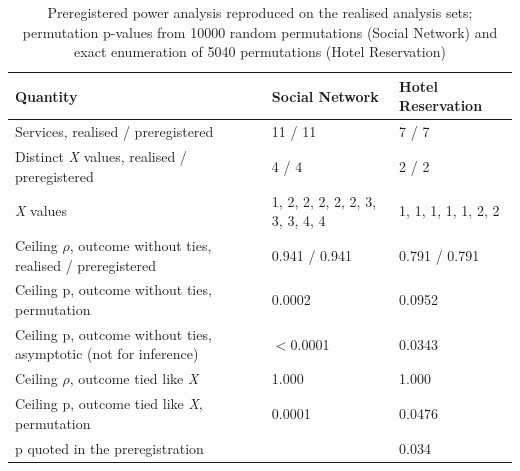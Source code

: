 \begin{table}[!t]
\centering
\caption{Preregistered power analysis reproduced on the realised analysis sets; permutation p-values from 10000 random permutations (Social Network) and exact enumeration of 5040 permutations (Hotel Reservation)}
\label{tab:tbl_ieee_power}
\footnotesize
\setlength{\tabcolsep}{3pt}

\begin{tabular}{p{3.9cm}p{2.0cm}p{1.9cm}}
\toprule
\textbf{Quantity} & \textbf{Social Network} & \textbf{Hotel Reservation} \\
\midrule
Services, realised / preregistered & 11 / 11 & 7 / 7 \\
Distinct \textit{X} values, realised / preregistered & 4 / 4 & 2 / 2 \\
\textit{X} values & 1, 2, 2, 2, 2, 2, 3, 3, 3, 4, 4 & 1, 1, 1, 1, 1, 2, 2 \\
Ceiling $\rho$, outcome without ties, realised / preregistered & 0.941 / 0.941 & 0.791 / 0.791 \\
Ceiling p, outcome without ties, permutation & 0.0002 & 0.0952 \\
Ceiling p, outcome without ties, asymptotic (not for inference) & $<$0.0001 & 0.0343 \\
Ceiling $\rho$, outcome tied like \textit{X} & 1.000 & 1.000 \\
Ceiling p, outcome tied like \textit{X}, permutation & 0.0001 & 0.0476 \\
p quoted in the preregistration &  & 0.034 \\
\bottomrule
\end{tabular}
\end{table}
